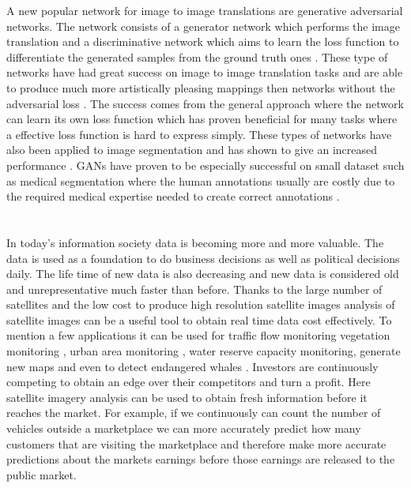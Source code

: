 \documentclass{kththesis}
\begin{document}
A new popular network for image to image translations are generative adversarial networks. The network consists of a generator network which performs the image translation and a discriminative network which aims to learn the loss function to differentiate the generated samples from the ground truth ones \parencite{goodfellow_nips_2016}. These type of networks have had great success on image to image translation tasks and are able to produce much more artistically pleasing mappings then networks without the adversarial loss \parencite{ledig_photo-realistic_2016, isola_image--image_2016}. The success comes from the general approach where the network can learn its own loss function which has proven beneficial for many tasks where a effective loss function is hard to express simply. These types of networks have also been applied to image segmentation and has shown to give an increased performance \parencite{luc_semantic_2016, souly_semi_2017}. GANs have proven to be especially successful on small dataset such as medical segmentation where the human annotations usually are costly due to the required medical expertise needed to create correct annotations \parencite{souly_semi_2017, xue_segan:_2017, yang_automatic_2017, rezaei_conditional_2017, arbelle_microscopy_2017}.\\
\\
\\
In today's information society data is becoming more and more valuable. The data is used as a foundation to do business decisions  as well as political decisions daily. The life time of new data is also decreasing and new data is considered old and unrepresentative much faster than before. Thanks to the large number of satellites and the low cost to produce high resolution satellite images analysis of satellite images can be a useful tool to obtain real time data cost effectively. To mention a few applications it can be used for traffic flow monitoring \parencite{ruhe_traffic_2003, moranduzzo_automatic_2014} vegetation monitoring \parencite{uto_characterization_2013, berni_thermal_2009}, urban area monitoring \parencite{moranduzzo_lbp-based_2015}, water reserve capacity monitoring, generate new maps \parencite{isola_image--image_2016} and even to detect endangered whales \parencite{polzounov_right_2016}. Investors are continuously competing to obtain an edge over their competitors and turn a profit. Here satellite imagery analysis can be used to obtain fresh information before it reaches the market. For example, if we continuously can count the number of vehicles outside a marketplace we can more accurately predict how many customers that are visiting the marketplace and therefore make more accurate predictions about the markets earnings before those earnings are released to the public market.\\
\end{document}
